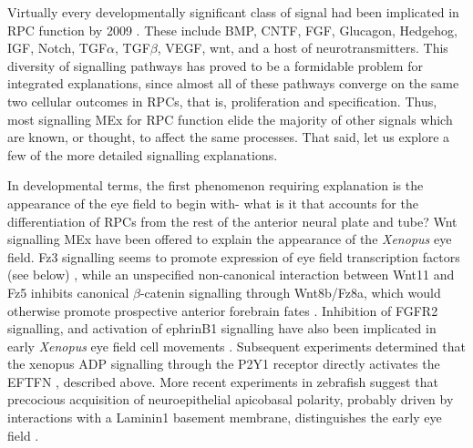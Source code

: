 \documentclass{ut-thesis}
\begin{document}
\begin{NoHyper}
Virtually every developmentally significant class of signal had been implicated in RPC function by 2009 \cite{Agathocleous2009}. These include BMP, CNTF, FGF, Glucagon, Hedgehog, IGF, Notch, TGF$\alpha$, TGF$\beta$, VEGF, wnt, and a host of neurotransmitters. This diversity of signalling pathways has proved to be a formidable problem for integrated explanations, since almost all of these pathways converge on the same two cellular outcomes in RPCs, that is, proliferation and specification. Thus, most signalling MEx for RPC function elide the majority of other signals which are known, or thought, to affect the same processes. That said, let us explore a few of the more detailed signalling explanations.

In developmental terms, the first phenomenon requiring explanation is the appearance of the eye field to begin with- what is it that accounts for the differentiation of RPCs from the rest of the anterior neural plate and tube? Wnt signalling MEx have been offered to explain the appearance of the \textit{Xenopus} eye field. Fz3 signalling seems to promote expression of eye field transcription factors (see below) \cite{Rasmussen2001}, while an unspecified non-canonical interaction between Wnt11 and Fz5 inhibits canonical $\beta$-catenin signalling through Wnt8b/Fz8a, which would otherwise promote prospective anterior forebrain fates \cite{Cavodeassi2005}. Inhibition of FGFR2 signalling, and activation of ephrinB1 signalling have also been implicated in early \textit{Xenopus} eye field cell movements \cite{Moore2004}. Subsequent experiments determined that the xenopus ADP signalling through the P2Y1 receptor directly activates the EFTFN \cite{Masse2007}, described above. More recent experiments in zebrafish suggest that precocious acquisition of neuroepithelial apicobasal polarity, probably driven by interactions with a Laminin1 basement membrane, distinguishes the early eye field \cite{Ivanovitch2013}.


\end{NoHyper}
\end{document}
